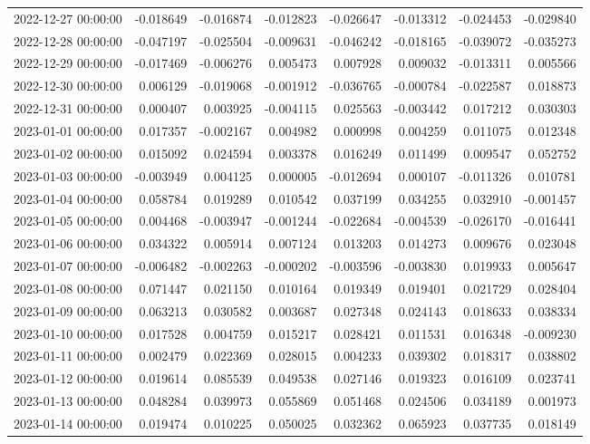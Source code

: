 \begin{tabular}{lrrrrrrr}
2022-12-27 00:00:00 & -0.018649 & -0.016874 & -0.012823 & -0.026647 & -0.013312 & -0.024453 & -0.029840 \\
2022-12-28 00:00:00 & -0.047197 & -0.025504 & -0.009631 & -0.046242 & -0.018165 & -0.039072 & -0.035273 \\
2022-12-29 00:00:00 & -0.017469 & -0.006276 & 0.005473 & 0.007928 & 0.009032 & -0.013311 & 0.005566 \\
2022-12-30 00:00:00 & 0.006129 & -0.019068 & -0.001912 & -0.036765 & -0.000784 & -0.022587 & 0.018873 \\
2022-12-31 00:00:00 & 0.000407 & 0.003925 & -0.004115 & 0.025563 & -0.003442 & 0.017212 & 0.030303 \\
2023-01-01 00:00:00 & 0.017357 & -0.002167 & 0.004982 & 0.000998 & 0.004259 & 0.011075 & 0.012348 \\
2023-01-02 00:00:00 & 0.015092 & 0.024594 & 0.003378 & 0.016249 & 0.011499 & 0.009547 & 0.052752 \\
2023-01-03 00:00:00 & -0.003949 & 0.004125 & 0.000005 & -0.012694 & 0.000107 & -0.011326 & 0.010781 \\
2023-01-04 00:00:00 & 0.058784 & 0.019289 & 0.010542 & 0.037199 & 0.034255 & 0.032910 & -0.001457 \\
2023-01-05 00:00:00 & 0.004468 & -0.003947 & -0.001244 & -0.022684 & -0.004539 & -0.026170 & -0.016441 \\
2023-01-06 00:00:00 & 0.034322 & 0.005914 & 0.007124 & 0.013203 & 0.014273 & 0.009676 & 0.023048 \\
2023-01-07 00:00:00 & -0.006482 & -0.002263 & -0.000202 & -0.003596 & -0.003830 & 0.019933 & 0.005647 \\
2023-01-08 00:00:00 & 0.071447 & 0.021150 & 0.010164 & 0.019349 & 0.019401 & 0.021729 & 0.028404 \\
2023-01-09 00:00:00 & 0.063213 & 0.030582 & 0.003687 & 0.027348 & 0.024143 & 0.018633 & 0.038334 \\
2023-01-10 00:00:00 & 0.017528 & 0.004759 & 0.015217 & 0.028421 & 0.011531 & 0.016348 & -0.009230 \\
2023-01-11 00:00:00 & 0.002479 & 0.022369 & 0.028015 & 0.004233 & 0.039302 & 0.018317 & 0.038802 \\
2023-01-12 00:00:00 & 0.019614 & 0.085539 & 0.049538 & 0.027146 & 0.019323 & 0.016109 & 0.023741 \\
2023-01-13 00:00:00 & 0.048284 & 0.039973 & 0.055869 & 0.051468 & 0.024506 & 0.034189 & 0.001973 \\
2023-01-14 00:00:00 & 0.019474 & 0.010225 & 0.050025 & 0.032362 & 0.065923 & 0.037735 & 0.018149 \\

\end{tabular}
